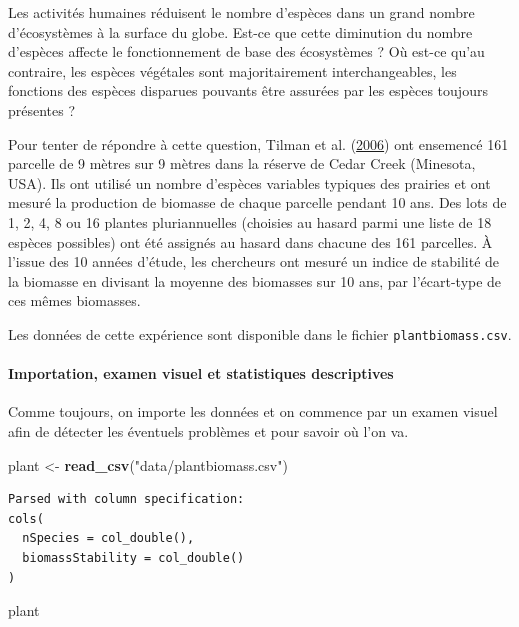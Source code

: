 \documentclass[a4paperpaper,]{article}
\newenvironment{Shaded}{\begin{snugshade}}{\end{snugshade}}
\newcommand{\KeywordTok}[1]{\textcolor[rgb]{0.12,0.11,0.11}{\textbf{#1}}}
\newcommand{\NormalTok}[1]{\textcolor[rgb]{0.12,0.11,0.11}{#1}}
\newcommand{\StringTok}[1]{\textcolor[rgb]{0.75,0.01,0.01}{#1}}
\let\oldparagraph\paragraph
\renewcommand{\paragraph}[1]{\oldparagraph{#1}\mbox{}}
\begin{document}
Les activités humaines réduisent le nombre d'espèces dans un grand nombre d'écosystèmes à la surface du globe. Est-ce que cette diminution du nombre d'espèces affecte le fonctionnement de base des écosystèmes ? Où est-ce qu'au contraire, les espèces végétales sont majoritairement interchangeables, les fonctions des espèces disparues pouvants être assurées par les espèces toujours présentes ?

Pour tenter de répondre à cette question, Tilman et al. (\protect\hyperlink{ref-tilman2006}{2006}) ont ensemencé 161 parcelle de 9 mètres sur 9 mètres dans la réserve de Cedar Creek (Minesota, USA). Ils ont utilisé un nombre d'espèces variables typiques des prairies et ont mesuré la production de biomasse de chaque parcelle pendant 10 ans. Des lots de 1, 2, 4, 8 ou 16 plantes pluriannuelles (choisies au hasard parmi une liste de 18 espèces possibles) ont été assignés au hasard dans chacune des 161 parcelles. À l'issue des 10 années d'étude, les chercheurs ont mesuré un indice de stabilité de la biomasse en divisant la moyenne des biomasses sur 10 ans, par l'écart-type de ces mêmes biomasses.

Les données de cette expérience sont disponible dans le fichier \texttt{plantbiomass.csv}.

\hypertarget{importation-examen-visuel-et-statistiques-descriptives}{%
\paragraph{Importation, examen visuel et statistiques descriptives}\label{importation-examen-visuel-et-statistiques-descriptives}}

Comme toujours, on importe les données et on commence par un examen visuel afin de détecter les éventuels problèmes et pour savoir où l'on va.

\begin{Shaded}
\begin{Highlighting}[]
\NormalTok{plant <-}\StringTok{ }\KeywordTok{read_csv}\NormalTok{(}\StringTok{"data/plantbiomass.csv"}\NormalTok{)}
\end{Highlighting}
\end{Shaded}

\begin{verbatim}
Parsed with column specification:
cols(
  nSpecies = col_double(),
  biomassStability = col_double()
)
\end{verbatim}

\begin{Shaded}
\begin{Highlighting}[]
\NormalTok{plant}
\end{Highlighting}
\end{Shaded}
\end{document}
